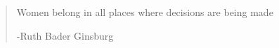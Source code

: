 \documentclass[12pt]{article}
\begin{document}

\tableofcontents
\newpage
\listoftables
\thispagestyle{empty}
\newpage

\begin{quotation}
	Women belong in all places where decisions are being made
\begin{flushright}
-Ruth Bader Ginsburg
\end{flushright}
\end{quotation}






\newpage


\newpage
\appendix


\end{document}
